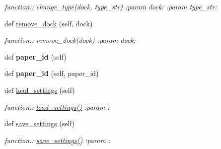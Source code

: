 \begin{DoxyCompactItemize}
\begin{DoxyCompactList}\small\item\em function\+:\+: change\+\_\+type(dock, type\+\_\+str) \+:param dock\+: \+:param type\+\_\+str\+: \end{DoxyCompactList}\item 
def \hyperlink{classplume-creator_1_1src_1_1plume_1_1gui_1_1docks_1_1_dock_system_aab9ff5f27b1fba99e2c968d0d883a071}{remove\+\_\+dock} (self, dock)\hypertarget{classplume-creator_1_1src_1_1plume_1_1gui_1_1docks_1_1_dock_system_aab9ff5f27b1fba99e2c968d0d883a071}{}\label{classplume-creator_1_1src_1_1plume_1_1gui_1_1docks_1_1_dock_system_aab9ff5f27b1fba99e2c968d0d883a071}

\begin{DoxyCompactList}\small\item\em function\+:\+: remove\+\_\+dock(dock) \+:param dock\+: \end{DoxyCompactList}\item 
def {\bfseries paper\+\_\+id} (self)\hypertarget{classplume-creator_1_1src_1_1plume_1_1gui_1_1docks_1_1_dock_system_aae3df9ca29ac7c33485c0aede9480ad8}{}\label{classplume-creator_1_1src_1_1plume_1_1gui_1_1docks_1_1_dock_system_aae3df9ca29ac7c33485c0aede9480ad8}

\item 
def {\bfseries paper\+\_\+id} (self, paper\+\_\+id)\hypertarget{classplume-creator_1_1src_1_1plume_1_1gui_1_1docks_1_1_dock_system_a0c8d02861f86805c73904bf719204583}{}\label{classplume-creator_1_1src_1_1plume_1_1gui_1_1docks_1_1_dock_system_a0c8d02861f86805c73904bf719204583}

\item 
def \hyperlink{classplume-creator_1_1src_1_1plume_1_1gui_1_1docks_1_1_dock_system_ae2eb9b8080ff2f8a8ccb4691d9a9fd20}{load\+\_\+settings} (self)\hypertarget{classplume-creator_1_1src_1_1plume_1_1gui_1_1docks_1_1_dock_system_ae2eb9b8080ff2f8a8ccb4691d9a9fd20}{}\label{classplume-creator_1_1src_1_1plume_1_1gui_1_1docks_1_1_dock_system_ae2eb9b8080ff2f8a8ccb4691d9a9fd20}

\begin{DoxyCompactList}\small\item\em function\+:\+: \hyperlink{classplume-creator_1_1src_1_1plume_1_1gui_1_1docks_1_1_dock_system_ae2eb9b8080ff2f8a8ccb4691d9a9fd20}{load\+\_\+settings()} \+:param \+: \end{DoxyCompactList}\item 
def \hyperlink{classplume-creator_1_1src_1_1plume_1_1gui_1_1docks_1_1_dock_system_ad15ee63fb72e848ce44e03aa1af3d420}{save\+\_\+settings} (self)\hypertarget{classplume-creator_1_1src_1_1plume_1_1gui_1_1docks_1_1_dock_system_ad15ee63fb72e848ce44e03aa1af3d420}{}\label{classplume-creator_1_1src_1_1plume_1_1gui_1_1docks_1_1_dock_system_ad15ee63fb72e848ce44e03aa1af3d420}

\begin{DoxyCompactList}\small\item\em function\+:\+: \hyperlink{classplume-creator_1_1src_1_1plume_1_1gui_1_1docks_1_1_dock_system_ad15ee63fb72e848ce44e03aa1af3d420}{save\+\_\+settings()} \+:param \+: \end{DoxyCompactList}\end{DoxyCompactItemize}
